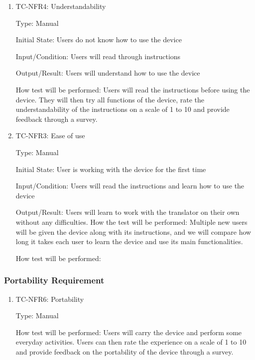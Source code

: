 \documentclass[12pt]{article}
\begin{document}
\begin{enumerate}

\item{TC-NFR4: Understandability\\}

Type: Manual
					
Initial State: Users do not know how to use the device
					
Input/Condition: Users will read through instructions
					
Output/Result: Users will understand how to use the device
					
How test will be performed: Users will read the instructions before using the device. They will then try all functions of the device, rate the understandability of the instructions on a scale of 1 to 10 and provide feedback through a survey.

\item{TC-NFR3: Ease of use\\}

Type: Manual
					
Initial State: User is working with the device for the first time
					
Input/Condition: Users will read the instructions and learn how to use the device
					
Output/Result: Users will learn to work with the translator on their own without any difficulties.
How the test will be performed: Multiple new users will be given the device along with its instructions, and we will compare how long it takes each user to learn the device and use its main functionalities.
					
How test will be performed:

\end{enumerate}

\subsubsection{Portability Requirement}

\begin{enumerate}

\item{TC-NFR6: Portability\\}

Type: Manual
					
How test will be performed: Users will carry the device and perform some everyday activities. Users can then rate the experience on a scale of 1 to 10 and provide feedback on the portability of the device through a survey.

\end{enumerate}
\end{document}
